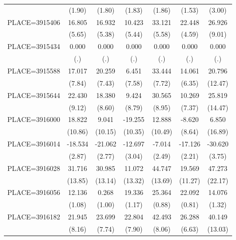 {\begin{tabular}{l*{6}{c}}
                    &      (1.90)&      (1.80)&      (1.83)&      (1.86)&      (1.53)&      (3.00)\\
PLACE=3915406       &      16.805&      16.932&      10.423&      33.121&      22.448&      26.926\\
                    &      (5.65)&      (5.38)&      (5.44)&      (5.58)&      (4.59)&      (9.01)\\
PLACE=3915434       &       0.000&       0.000&       0.000&       0.000&       0.000&       0.000\\
                    &         (.)&         (.)&         (.)&         (.)&         (.)&         (.)\\
PLACE=3915588       &      17.017&      20.259&       6.451&      33.444&      14.061&      20.796\\
                    &      (7.84)&      (7.43)&      (7.58)&      (7.72)&      (6.35)&     (12.47)\\
PLACE=3915644       &      22.430&      18.380&       9.424&      30.565&      10.269&      25.819\\
                    &      (9.12)&      (8.60)&      (8.79)&      (8.95)&      (7.37)&     (14.47)\\
PLACE=3916000       &      18.822&       9.041&     -19.255&      12.888&      -8.620&       6.850\\
                    &     (10.86)&     (10.15)&     (10.35)&     (10.49)&      (8.64)&     (16.89)\\
PLACE=3916014       &     -18.534&     -21.062&     -12.697&      -7.014&     -17.126&     -30.620\\
                    &      (2.87)&      (2.77)&      (3.04)&      (2.49)&      (2.21)&      (3.75)\\
PLACE=3916028       &      31.716&      30.985&      11.072&      44.747&      19.569&      47.273\\
                    &     (13.85)&     (13.14)&     (13.32)&     (13.69)&     (11.27)&     (22.17)\\
PLACE=3916056       &      12.136&       0.268&      19.336&      25.364&      22.092&      14.076\\
                    &      (1.08)&      (1.00)&      (1.17)&      (0.88)&      (0.81)&      (1.32)\\
PLACE=3916182       &      21.945&      23.699&      22.804&      42.493&      26.288&      40.149\\
                    &      (8.16)&      (7.74)&      (7.90)&      (8.06)&      (6.63)&     (13.03)\\

\end{tabular}}
